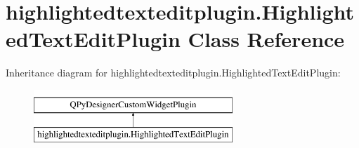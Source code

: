 \hypertarget{classhighlightedtexteditplugin_1_1HighlightedTextEditPlugin}{}\section{highlightedtexteditplugin.\+Highlighted\+Text\+Edit\+Plugin Class Reference}
\label{classhighlightedtexteditplugin_1_1HighlightedTextEditPlugin}
Inheritance diagram for highlightedtexteditplugin.\+Highlighted\+Text\+Edit\+Plugin\+:\begin{figure}[H]
\begin{center}
\leavevmode
\includegraphics[height=2.000000cm]{classhighlightedtexteditplugin_1_1HighlightedTextEditPlugin}
\end{center}
\end{figure}
